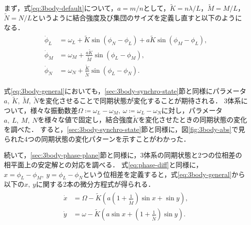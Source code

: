 \documentclass[../main]{subfiles}
\begin{document}
まず，式\eqref{eq:3body-default}について，$a=m/n$として，$\tilde{K}=n\lambda/L$，$\tilde{M}=M/L$，$\tilde{N}=N/L$というように結合強度及び集団のサイズを定義し直すと以下のようになる．
\begin{align}
    \label{eq:3body-general}
    \begin{split}
        \dot{\phi}_L&=\omega_L+\tilde{K}\sin\left( \phi_N-\phi_L \right)+a\tilde{K}\sin\left( \phi_M-\phi_L \right),\\
        \dot{\phi}_M&=\omega_M+\frac{a\tilde{K}}{\tilde{M}}\sin\left( \phi_L-\phi_M \right), \\
        \dot{\phi}_N&=\omega_N+\frac{\tilde{K}}{\tilde{N}}\sin\left( \phi_L-\phi_N \right).    
    \end{split}
\end{align}

式\eqref{eq:3body-general}においても，\ref{sec:3body-synchro-state}節と同様にパラメータ$a,\ \tilde{K},\ \tilde{M},\ \tilde{N}$を変化させることで同期状態が変化することが期待される．
3体系について，様々な振動数差$\Omega\coloneqq\omega_L-\omega_M,\ \omega\coloneqq\omega_L-\omega_N$に対し，パラメータ$a,\ L,\ M,\ N$を様々な値で固定し，結合強度$\tilde{K}$を変化させたときの同期状態の変化を調べた．
すると，\ref{sec:3body-synchro-state}節と同様に，図\ref{fig:3body-abs}で見られた4つの同期状態の変化パターンを示すことがわかった．

続いて，\ref{sec:3body-phase-plane}節と同様に，3体系の同期状態と2つの位相差の相平面上の安定解との対応を調べる．
式\eqref{eq:phase-diff}と同様に，$x=\phi_L-\phi_M,\ y=\phi_L-\phi_N$という位相差を定義すると，式\eqref{eq:3body-general}から以下の$x,\ y$に関する2本の微分方程式が得られる．
\begin{align}
    \label{eq:phase-diff-general}
    \begin{split}
        \dot{x}&=\Omega-\tilde{K}\left( a\left(1+\frac{1}{\tilde{M}}\right)\sin x +\sin y\right),\\
        \dot{y}&=\omega-\tilde{K}\left( a\sin x +\left(1+\frac{1}{\tilde{N}}\right)\sin y\right).
    \end{split}
\end{align}
\end{document}
